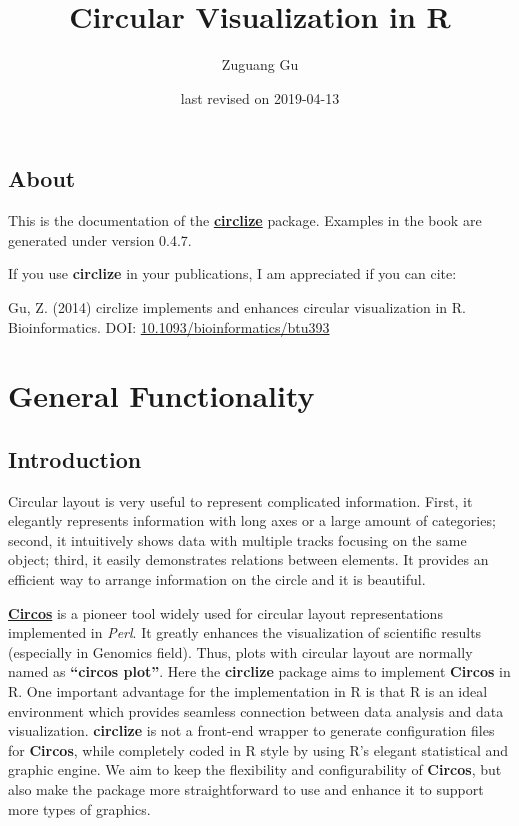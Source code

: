 \documentclass[]{book}
\title{Circular Visualization in R}
\author{Zuguang Gu}
\date{last revised on 2019-04-13}
\begin{document}
\maketitle

{
\setcounter{tocdepth}{1}
\tableofcontents
}
\chapter*{About}\label{about}

This is the documentation of the
\href{https://cran.r-project.org/package=circlize}{\textbf{circlize}}
package. Examples in the book are generated under version 0.4.7.

If you use \textbf{circlize} in your publications, I am appreciated if
you can cite:

Gu, Z. (2014) circlize implements and enhances circular visualization in
R. Bioinformatics. DOI:
\href{https://doi.org/10.1093/bioinformatics/btu393}{10.1093/bioinformatics/btu393}

\part{General
Functionality}\label{part-general-functionality}

\chapter{Introduction}\label{introduction}

Circular layout is very useful to represent complicated information.
First, it elegantly represents information with long axes or a large
amount of categories; second, it intuitively shows data with multiple
tracks focusing on the same object; third, it easily demonstrates
relations between elements. It provides an efficient way to arrange
information on the circle and it is beautiful.

\href{http://circos.ca}{\textbf{Circos}} is a pioneer tool widely used
for circular layout representations implemented in \emph{Perl}. It
greatly enhances the visualization of scientific results (especially in
Genomics field). Thus, plots with circular layout are normally named as
\textbf{``circos plot''}. Here the \textbf{circlize} package aims to
implement \textbf{Circos} in R. One important advantage for the
implementation in R is that R is an ideal environment which provides
seamless connection between data analysis and data visualization.
\textbf{circlize} is not a front-end wrapper to generate configuration
files for \textbf{Circos}, while completely coded in R style by using
R's elegant statistical and graphic engine. We aim to keep the
flexibility and configurability of \textbf{Circos}, but also make the
package more straightforward to use and enhance it to support more types
of graphics.
\end{document}
